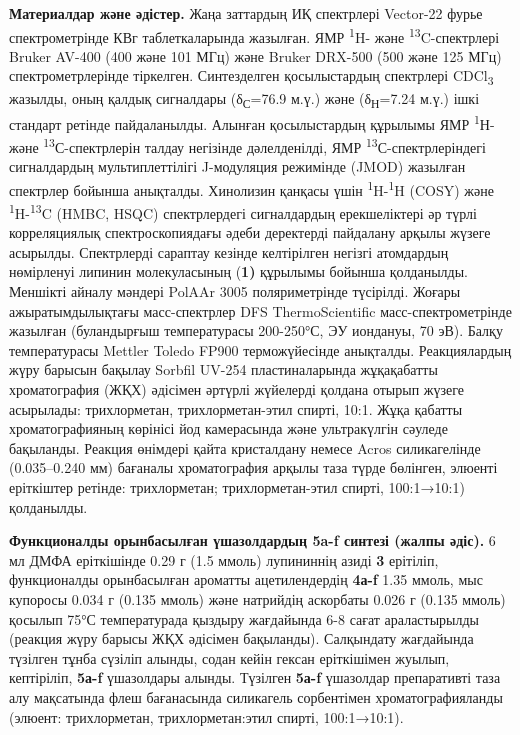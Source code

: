 \textbf{Материалдар және әдістер.} Жаңа заттардың ИҚ спектрлері
Vector-22 фурье спектрометрінде КВг таблеткаларында жазылған. ЯМР
\textsuperscript{1}H- және \textsuperscript{13}C-спектрлері Bruker
AV-400 (400 және 101 МГц) және Bruker DRX-500 (500 және 125 МГц)
спектрометрлерінде тіркелген. Синтезделген қосылыстардың спектрлері
CDCl\textsubscript{3} жазылды, оның қалдық сигналдары
(δ\textsubscript{С}=76.9 м.ү.) және (δ\textsubscript{Н}=7.24 м.ү.) ішкі
стандарт ретінде пайдаланылды. Алынған қосылыстардың құрылымы ЯМР
\textsuperscript{1}Н- және \textsuperscript{13}С-спектрлерін талдау
негізінде дәлелденілді, ЯМР \textsuperscript{13}С-спектрлеріндегі
сигналдардың мультиплеттілігі J-модуляция режимінде (JMOD) жазылған
спектрлер бойынша анықталды. Хинолизин қанқасы үшін
\textsuperscript{1}H-\textsuperscript{1}H (COSY) және
\textsuperscript{1}H-\textsuperscript{13}C (HMBC, HSQC) спектрлердегі
сигналдардың ерекшеліктері әр түрлі корреляциялық спектроскопиядағы
әдеби деректерді пайдалану арқылы жүзеге асырылды. Спектрлерді сараптау
кезінде келтірілген негізгі атомдардың нөмірленуі липинин молекуласының
(\textbf{1)} құрылымы бойынша қолданылды. Меншікті айналу мәндері PolAAr
3005 поляриметрінде түсірілді. Жоғары ажыратымдылықтағы масс-спектрлер
DFS ThermoScientific масс-спектрометрінде жазылған (буландырғыш
температурасы 200-250°С, ЭУ иондануы, 70 эВ). Балқу температурасы
Mettler Toledo FP900 терможүйесінде анықталды. Реакциялардың жүру
барысын бақылау Sorbfil UV-254 пластиналарында жұқақабатты хроматография
(ЖҚХ) әдісімен әртүрлі жүйелерді қолдана отырып жүзеге асырылады:
трихлорметан, трихлорметан-этил спирті, 10:1. Жұқа қабатты
хроматографияның көрінісі йод камерасында және ультракүлгін сәуледе
бақыланды. Реакция өнімдері қайта кристалдану немесе Acros силикагелінде
(0.035--0.240 мм) бағаналы хроматография арқылы таза түрде бөлінген,
элюенті еріткіштер ретінде: трихлорметан; трихлорметан-этил спирті,
100:1→10:1) қолданылды.

\textbf{Функционалды орынбасылған үшазолдардың 5a-f синтезі (жалпы
әдіс).} 6 мл ДМФА еріткішінде 0.29 г (1.5 ммоль) лупининнің азиді
\textbf{3} ерітіліп, функционалды орынбасылған ароматты ацетилендердің
\textbf{4а-f} 1.35 ммоль, мыс купоросы 0.034 г (0.135 ммоль) және
натрийдің аскорбаты 0.026 г (0.135 ммоль) қосылып 75°С температурада
қыздыру жағдайында 6-8 сағат араластырылды (реакция жүру барысы ЖҚХ
әдісімен бақыланды). Салқындату жағдайында түзілген тұнба сүзіліп
алынды, содан кейін гексан еріткішімен жуылып, кептіріліп, \textbf{5а-f}
үшазолдары алынды. Түзілген \textbf{5а-f} үшазолдар препаративті таза
алу мақсатында флеш бағанасында силикагель сорбентімен
хроматографияланды (элюент: трихлорметан, трихлорметан:этил спирті,
100:1→10:1).


